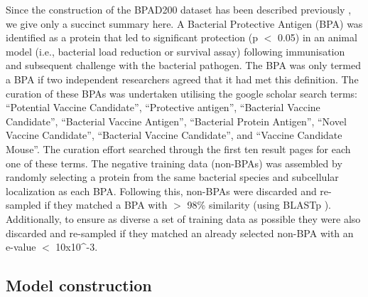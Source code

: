 \documentclass[10pt,journal,compsoc,twoside]{IEEEtran}
\begin{document}
Since the construction of the BPAD200 dataset has been described previously \cite{heinson_2017}, we give only a succinct summary here. A Bacterial Protective Antigen (BPA) was identified as a protein that led to significant protection (p $<$ 0.05) in an animal model (i.e., bacterial load reduction or survival assay) following immunisation and subsequent challenge with the bacterial pathogen. The BPA was only termed a BPA if two independent researchers agreed that it had met this definition. The curation of these BPAs was undertaken utilising the google scholar search terms: “Potential Vaccine Candidate”, “Protective antigen”, “Bacterial Vaccine Candidate”, “Bacterial Vaccine Antigen”, “Bacterial Protein Antigen”, “Novel Vaccine Candidate”, “Bacterial Vaccine Candidate”, and “Vaccine Candidate Mouse”. The curation effort searched through the first ten result pages for each one of these terms. The negative training data (non-BPAs) was assembled by randomly selecting a protein from the same bacterial species and subcellular localization as each BPA. Following this, non-BPAs were discarded and re-sampled if they matched a BPA with $>$ 98\% similarity (using BLASTp \cite{blast}). Additionally, to ensure as diverse a set of training data as possible they were also discarded and re-sampled if they matched an already selected non-BPA with an e-value $<$ 10x10^-3\cite{heinson_2017}\cite{blast}.


\subsection{Model construction}
\label{sec:methods2}
\end{document}
